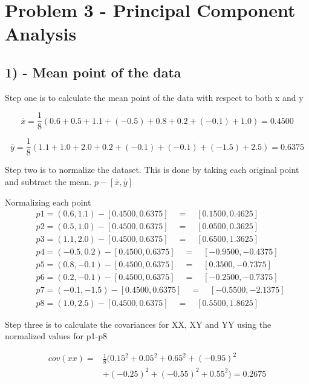 \section{Problem 3 - Principal Component Analysis}
\subsection{1) - Mean point of the data}
Step one is to calculate the mean point of the data with respect to both x and y

$$\bar{x} = \frac{1}{8} (0.6 + 0.5 + 1.1 + (-0.5) + 0.8 + 0.2 + (-0.1) + 1.0) = 0.4500$$

$$\bar{y} = \frac{1}{8} (1.1 + 1.0 + 2.0 + 0.2 + (-0.1) + (-0.1) + (-1.5) + 2.5) = 0.6375$$

Step two is to normalize the dataset. This is done by taking each original point
and subtract the mean.
$p - [\bar{x}, \bar{y}]$

Normalizing each point
\begin{align}
    &p1 = (0.6 , 1.1) - [0.4500, 0.6375] \quad = \quad [0.1500, 0.4625] \\
    &p2 = (0.5 , 1.0) - [0.4500, 0.6375] \quad = \quad [0.0500, 0.3625] \\
    &p3 = (1.1 , 2.0) - [0.4500, 0.6375] \quad = \quad [0.6500, 1.3625] \\
    &p4 = (-0.5 , 0.2) - [0.4500, 0.6375] \quad = \quad [-0.9500, -0.4375] \\
    &p5 = (0.8, -0.1) - [0.4500, 0.6375] \quad = \quad [0.3500, -0.7375] \\
    &p6 = (0.2 , -0.1) - [0.4500, 0.6375] \quad = \quad [-0.2500, -0.7375] \\
    &p7 = (-0.1 , -1.5) - [0.4500, 0.6375] \quad = \quad [-0.5500, -2.1375] \\
    &p8 = (1.0, 2.5) - [0.4500, 0.6375] \quad = \quad [0.5500, 1.8625] 
\end{align}

Step three is to calculate the covariances for XX, XY and YY using the normalized values for p1-p8


\begin{equation}
    \begin{split}
        cov(xx) = & \frac{1}{8} \Big(0.15^2 + 0.05^2 + 0.65^2 + (-0.95)^2 \\
                  & + (-0.25)^2 + (-0.55)^2 + 0.55^2 \Big) = 0.2675
    \end{split}
\end{equation}

